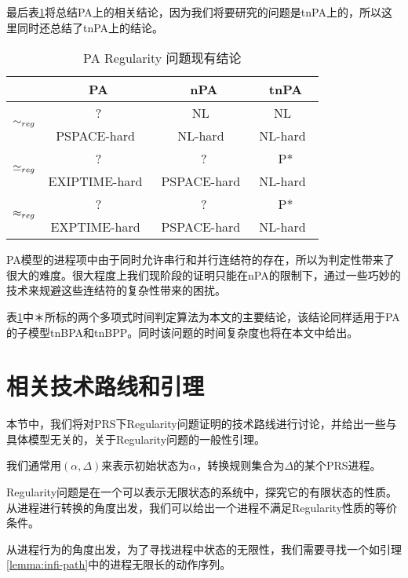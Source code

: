 最后表\ref{tab:pa-reg}将总结PA上的相关结论，因为我们将要研究的问题是tnPA上的，所以这里同时还总结了tnPA上的结论。

\begin{table}[htbp]
\begin{center}
\begin{tabular}{|c|c|c|c|}
\hline
	&PA	&nPA	&tnPA\\
\hline
\hline
\multirow{2}{*}{$\sim_{reg}$} &
 ? &NL~\cite{Kucera1996} &NL~\cite{Kucera1996} \\
& PSPACE-hard~\cite{Srba2002a} & NL-hard~\cite{Srba2002a} & NL-hard~\cite{Srba2002a}\\
\hline
\multirow{2}{*}{$\simeq_{reg}$} &
 ? & ? &P* \\
& EXIPTIME-hard~\cite{Mayr2003} & PSPACE-hard~\cite{Srba2003} & NL-hard~\cite{Srba2002a}\\
\hline
\multirow{2}{*}{$\approx_{reg}$} &
 ? & ? &P* \\
& EXPTIME-hard~\cite{Mayr2003} & PSPACE-hard~\cite{Srba2003} & NL-hard~\cite{Srba2002a}\\
\hline
\end{tabular}
\caption{\textsf{PA} Regularity 问题现有结论}
\label{tab:pa-reg}
\end{center}
\end{table}
PA模型的进程项中由于同时允许串行和并行连结符的存在，所以为判定性带来了很大的难度。很大程度上我们现阶段的证明只能在nPA的限制下，通过一些巧妙的技术来规避这些连结符的复杂性带来的困扰。

表\ref{tab:pa-reg}中＊所标的两个多项式时间判定算法为本文的主要结论，该结论同样适用于PA的子模型tnBPA和tnBPP。同时该问题的时间复杂度也将在本文中给出。

\section{相关技术路线和引理}
\label{sec:lemma}

本节中，我们将对PRS下Regularity问题证明的技术路线进行讨论，并给出一些与具体模型无关的，关于Regularity问题的一般性引理。

我们通常用$(\alpha,\Delta)$来表示初始状态为$\alpha$，转换规则集合为$\Delta$的某个PRS进程。

Regularity问题是在一个可以表示无限状态的系统中，探究它的有限状态的性质。从进程进行转换的角度出发，我们可以给出一个进程不满足Regularity性质的等价条件。

从进程行为的角度出发，为了寻找进程中状态的无限性，我们需要寻找一个如引理\ref{lemma:infi-path}中的进程无限长的动作序列。

